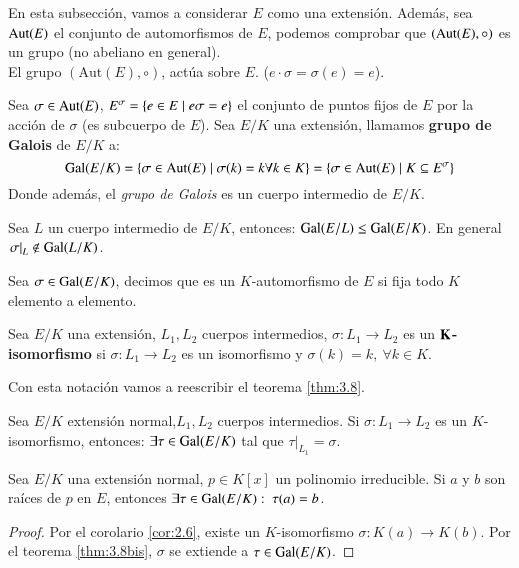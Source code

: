 En esta subsección, vamos a considerar $E$ como una extensión. Además, sea $\mathrm{Aut}(E)$ el conjunto de automorfismos de $E$, podemos comprobar que $(\mathrm{Aut}(E), \circ)$ es un grupo (no abeliano en general).\\

El grupo $(\mathrm{Aut}(E), \circ)$, actúa sobre $E$. ($e \cdot \sigma = \sigma(e) = e$).

\begin{dfn}
Sea $\sigma \in \mathrm{Aut}(E)$, $E^\sigma = \left\{e \in E \mid e \sigma = e\right\}$ el conjunto de puntos fijos de $E$ por la acción de $\sigma$ (es subcuerpo de $E$). Sea $E/K$ una extensión, llamamos \textbf{grupo de Galois} de $E/K$ a:
$$
    \mathrm{Gal}(E/K) = \left\{\sigma \in \mathrm{Aut}(E) \mid \sigma(k) = k \forall k \in K\right\} = \left\{\sigma \in \mathrm{Aut}(E) \mid K \subseteq E^\sigma\right\}
$$
Donde además, el \textit{grupo de Galois} es un cuerpo intermedio de $E/K$.
\end{dfn}

\begin{pro}
Sea $L$ un cuerpo intermedio de $E/K$, entonces: $\mathrm{Gal}(E/L) \leq \mathrm{Gal}(E/K)$. En general $\left.\sigma\right|_L \notin \mathrm{Gal}(L/K)$.
\end{pro}

\begin{obs}[Notación]
    Sea $\sigma \in \mathrm{Gal}(E/K)$, decimos que es un $K$-automorfismo de $E$ si fija todo $K$ elemento a elemento.
\end{obs}

\begin{dfn}[$K$-isomorfismo]
    Sea $E/K$ una extensión, $L_1, L_2$ cuerpos intermedios, $\sigma: L_1 \to L_2$ es un $\mathbf{K}$\textbf{-isomorfismo} si $\sigma: L_1 \to L_2$ es un isomorfismo y $\sigma(k) = k,\ \forall k \in K$.
\end{dfn}

Con esta notación vamos a reescribir el teorema \ref{thm:3.8}.
\begin{thm}\label{thm:3.8bis}
    Sea $E/K$ extensión normal,$L_1, L_2$ cuerpos intermedios. Si $\sigma: L_1 \to L_2$ es un $K$-isomorfismo, entonces: $\exists \tau \in \mathrm{Gal}(E/K)$ tal que $\left. \tau \right|_{L_1} = \sigma$.
\end{thm}

\begin{cor} \label{cor:3.10}
    Sea $E/K$ una extensión normal, $p \in K[x]$ un polinomio irreducible. Si $a$ y $b$ son raíces de $p$ en $E$, entonces $\exists \tau \in \mathrm{Gal}(E/K):\ \tau(a) = b$.
\end{cor}
\begin{proof}
    Por el corolario \ref{cor:2.6}, existe un $K$-isomorfismo $\sigma: K(a) \to K(b)$. Por el teorema \ref{thm:3.8bis}, $\sigma$ se extiende a $\tau \in \mathrm{Gal}(E/K)$.
\end{proof}

